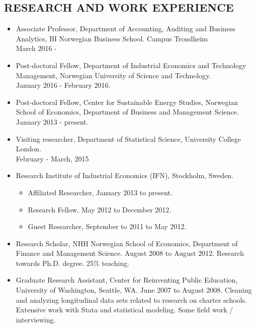 \documentclass[margin]{res}
\begin{document}
\begin{resume}
\section{RESEARCH AND WORK EXPERIENCE}      
                  \begin{itemize}
                  \setlength{\itemsep}{10pt}
                  \item[] Associate Professor, Department of Accounting, Auditing and Business Analytics, BI Norwegian Business School. Campus Trondheim \\ March 2016 - 
                  \item[] Post-doctoral Fellow, Department of Industrial Economics and Technology Management, Norwegian University of Science and Technology. \\ January 2016 - February 2016. 
                  \item[] Post-doctoral Fellow, Center for Sustainable Energy Studies, Norwegian School of Economics, Department of Business and Management Science. \\ January 2013 - present.

                  \item[] Visiting researcher, Department of Statistical Science, University College London. \\ February - March, 2015
                  
                  \item[] Research Institute of Industrial Economics (IFN), Stockholm, Sweden.
                    \begin{itemize} 
                    \item[] Affiliated Researcher, January 2013 to present.
                    \item[] Research Fellow, May 2012 to December 2012.
                    \item[] Guest Researcher, September to 2011 to May 2012.
                    \end{itemize}
                  \item[] Research Scholar, NHH Norwegian School of Economics, Department of Finance and Management Science. August 2008 to August 2012.  
                  Research towards Ph.D. degree.  25\% teaching.
                  
                  \item[] Graduate Research Assistant, Center for Reinventing Public Education, University of Washington, Seattle, WA. June 2007 to August 2008.  
                  Cleaning and analyzing longitudinal data sets related to research on charter schools.  Extensive work with Stata and statistical modeling.  Some field work / interviewing.
                  

\end{itemize}
\end{resume}
\end{document}
